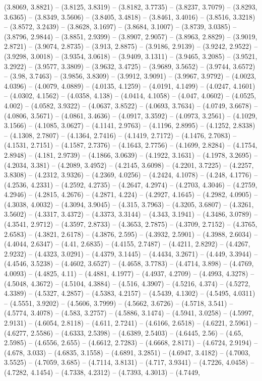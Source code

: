 (3.8069, 3.8821) -- (3.8125, 3.8319) -- (3.8182, 3.7735) -- (3.8237, 3.7079) -- (3.8293, 3.6365) -- (3.8349, 3.5606) -- (3.8405, 3.4818) -- (3.8461, 3.4016) -- (3.8516, 3.3218) -- (3.8572, 3.2439) -- (3.8628, 3.1697) -- (3.8684, 3.1007) -- (3.8739, 3.0385) -- (3.8796, 2.9844) -- (3.8851, 2.9399) -- (3.8907, 2.9057) -- (3.8963, 2.8829) -- (3.9019, 2.8721) -- (3.9074, 2.8735) -- (3.913, 2.8875) -- (3.9186, 2.9139) -- (3.9242, 2.9522) -- (3.9298, 3.0018) -- (3.9354, 3.0618) -- (3.9409, 3.1311) -- (3.9465, 3.2085) -- (3.9521, 3.2922) -- (3.9577, 3.3809) -- (3.9632, 3.4725) -- (3.9689, 3.5652) -- (3.9744, 3.6572) -- (3.98, 3.7463) -- (3.9856, 3.8309) -- (3.9912, 3.9091) -- (3.9967, 3.9792) -- (4.0023, 4.0396) -- (4.0079, 4.0889) -- (4.0135, 4.1259) -- (4.0191, 4.1499) -- (4.0247, 4.1601) -- (4.0302, 4.1562) -- (4.0358, 4.138) -- (4.0414, 4.1058) -- (4.047, 4.0602) -- (4.0525, 4.002) -- (4.0582, 3.9322) -- (4.0637, 3.8522) -- (4.0693, 3.7634) -- (4.0749, 3.6678) -- (4.0806, 3.5671) -- (4.0861, 3.4636) -- (4.0917, 3.3592) -- (4.0973, 3.2561) -- (4.1029, 3.1566) -- (4.1085, 3.0627) -- (4.1141, 2.9763) -- (4.1196, 2.8995) -- (4.1252, 2.8338) -- (4.1308, 2.7807) -- (4.1364, 2.7416) -- (4.1419, 2.7172) -- (4.1476, 2.7083) -- (4.1531, 2.7151) -- (4.1587, 2.7376) -- (4.1643, 2.7756) -- (4.1699, 2.8284) -- (4.1754, 2.8948) -- (4.181, 2.9739) -- (4.1866, 3.0639) -- (4.1922, 3.1631) -- (4.1978, 3.2695) -- (4.2034, 3.381) -- (4.2089, 3.4952) -- (4.2145, 3.6098) -- (4.2201, 3.7225) -- (4.2257, 3.8308) -- (4.2312, 3.9326) -- (4.2369, 4.0256) -- (4.2424, 4.1078) -- (4.248, 4.1776) -- (4.2536, 4.2331) -- (4.2592, 4.2735) -- (4.2647, 4.2974) -- (4.2703, 4.3046) -- (4.2759, 4.2946) -- (4.2815, 4.2676) -- (4.2871, 4.224) -- (4.2927, 4.1645) -- (4.2982, 4.0905) -- (4.3038, 4.0032) -- (4.3094, 3.9045) -- (4.315, 3.7963) -- (4.3205, 3.6807) -- (4.3261, 3.5602) -- (4.3317, 3.4372) -- (4.3373, 3.3144) -- (4.343, 3.1941) -- (4.3486, 3.0789) -- (4.3541, 2.9712) -- (4.3597, 2.8733) -- (4.3653, 2.7875) -- (4.3709, 2.7152) -- (4.3765, 2.6583) -- (4.3821, 2.6178) -- (4.3876, 2.595) -- (4.3932, 2.5901) -- (4.3988, 2.6034) -- (4.4044, 2.6347) -- (4.41, 2.6835) -- (4.4155, 2.7487) -- (4.4211, 2.8292) -- (4.4267, 2.9232) -- (4.4323, 3.0291) -- (4.4379, 3.1445) -- (4.4434, 3.2671) -- (4.449, 3.3944) -- (4.4546, 3.5238) -- (4.4602, 3.6527) -- (4.4658, 3.7783) -- (4.4714, 3.898) -- (4.4769, 4.0093) -- (4.4825, 4.11) -- (4.4881, 4.1977) -- (4.4937, 4.2709) -- (4.4993, 4.3278) -- (4.5048, 4.3672) -- (4.5104, 4.3884) -- (4.516, 4.3907) -- (4.5216, 4.374) -- (4.5272, 4.3389) -- (4.5327, 4.2857) -- (4.5383, 4.2157) -- (4.5439, 4.1302) -- (4.5495, 4.0311) -- (4.5551, 3.9202) -- (4.5606, 3.7999) -- (4.5662, 3.6726) -- (4.5718, 3.541) -- (4.5774, 3.4078) -- (4.583, 3.2757) -- (4.5886, 3.1474) -- (4.5941, 3.0258) -- (4.5997, 2.9131) -- (4.6054, 2.8118) -- (4.611, 2.7241) -- (4.6166, 2.6518) -- (4.6221, 2.5961) -- (4.6277, 2.5586) -- (4.6333, 2.5398) -- (4.6389, 2.5403) -- (4.6445, 2.56) -- (4.65, 2.5985) -- (4.6556, 2.655) -- (4.6612, 2.7283) -- (4.6668, 2.8171) -- (4.6724, 2.9194) -- (4.678, 3.033) -- (4.6835, 3.1558) -- (4.6891, 3.2851) -- (4.6947, 3.4182) -- (4.7003, 3.5525) -- (4.7059, 3.685) -- (4.7114, 3.8131) -- (4.717, 3.9341) -- (4.7226, 4.0458) -- (4.7282, 4.1454) -- (4.7338, 4.2312) -- (4.7393, 4.3013) -- (4.7449, 